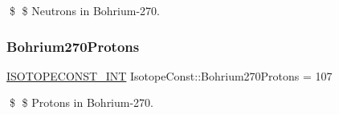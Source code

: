 \$ \$ Neutrons in Bohrium-\/270. \mbox{\label{group___isotope_const-_bohrium-_bh270_ga80e61db693f00643565c3d7018b0723b}} 
\subsubsection{\texorpdfstring{Bohrium270\+Protons}{Bohrium270Protons}}
{\footnotesize\ttfamily \mbox{\hyperlink{group___isotope_const-_macros_ga5f18360b3e99483a35c32d789e62621c}{I\+S\+O\+T\+O\+P\+E\+C\+O\+N\+S\+T\+\_\+\+I\+NT}} Isotope\+Const\+::\+Bohrium270\+Protons = 107}

\$ \$ Protons in Bohrium-\/270. 